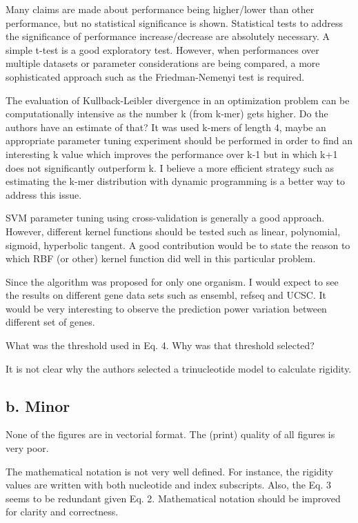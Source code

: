\documentclass[11pt]{article}
\begin{document}
 Many claims are made about performance being higher/lower than other performance, but no statistical significance is shown. Statistical tests to address the significance of performance increase/decrease are absolutely necessary. A simple t-test is a good exploratory test. However, when performances over multiple datasets or parameter considerations are being compared, a more sophisticated approach such as the Friedman-Nemenyi test is required.

 The evaluation of Kullback-Leibler divergence in an optimization problem can be computationally intensive as the number k (from k-mer) gets higher. Do the authors have an estimate of that? It was used k-mers of length 4, maybe an appropriate parameter tuning experiment should be performed in order to find an interesting k value which improves the performance over k-1 but in which k+1 does not significantly outperform k. I believe a more efficient strategy such as estimating the k-mer distribution with dynamic programming is a better way to address this issue.

 SVM parameter tuning using cross-validation is generally a good approach. However, different kernel functions should be tested such as linear, polynomial, sigmoid, hyperbolic tangent. A good contribution would be to state the reason to which RBF (or other) kernel function did well in this particular problem.

 Since the algorithm was proposed for only one organism. I would expect to see the results on different gene data sets such as ensembl, refseq and UCSC. It would be very interesting to observe the prediction power variation between different set of genes.

 What was the threshold used in Eq. 4. Why was that threshold selected?

 It is not clear why the authors selected a trinucleotide model to calculate rigidity.

\subsection*{b. Minor}

 None of the figures are in vectorial format. The (print) quality of all figures is very poor.

 The mathematical notation is not very well defined. For instance, the rigidity values are written with both nucleotide and index subscripts. Also, the Eq. 3 seems to be redundant given Eq. 2. Mathematical notation should be improved for clarity and correctness.
\end{document}

